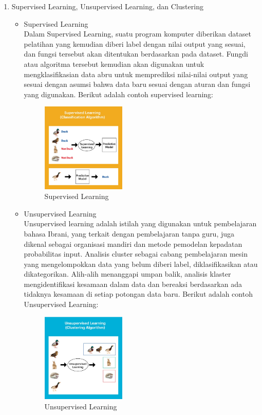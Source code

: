 \begin{enumerate}
\item Supervised Learning, Unsupervised Learning, dan Clustering
\begin{itemize}
\item Supervised Learning \\
Dalam Supervised Learning, suatu program komputer diberikan dataset pelatihan yang kemudian diberi label dengan nilai output yang sesuai, dan fungsi tersebut akan ditentukan berdasarkan pada dataset. Fungdi atau algoritma tersebut kemudian akan digunakan untuk mengklasifikasian data abru untuk memprediksi nilai-nilai output yang sesuai dengan asumsi bahwa data baru sesuai dengan aturan dan fungsi yang digunakan. Berikut adalah contoh supervised learning:
\begin{figure}[H]
		\includegraphics[width=4cm]{figures/1174073/2/supervised.jpg}
		\centering
		\caption{Supervised Learning}
\end{figure}

\item Unsupervised Learning \\
Unsupervised learning adalah istilah yang digunakan untuk pembelajaran bahasa Ibrani, yang terkait dengan pembelajaran tanpa guru, juga dikenal sebagai organisasi mandiri dan metode pemodelan kepadatan probabilitas input. Analisis cluster sebagai cabang pembelajaran mesin yang mengelompokkan data yang belum diberi label, diklasiﬁkasikan atau dikategorikan. Alih-alih menanggapi umpan balik, analisis klaster mengidentiﬁkasi kesamaan dalam data dan bereaksi berdasarkan ada tidaknya kesamaan di setiap potongan data baru. Berikut adalah contoh Unsupervised Learning:
\begin{figure}[H]
		\includegraphics[width=4cm]{figures/1174073/2/unsupervised.jpg}
		\centering
		\caption{Unsupervised Learning}
\end{figure}


\end{itemize}
\end{enumerate}
